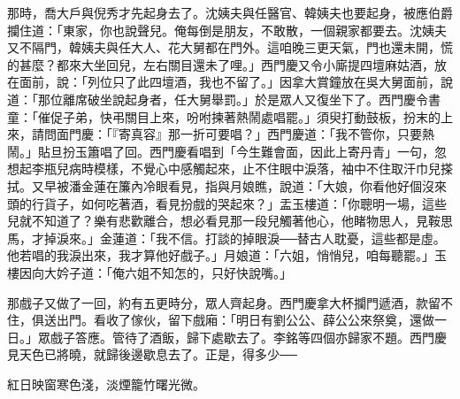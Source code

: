 那時，喬大戶與倪秀才先起身去了。沈姨夫與任醫官、韓姨夫也要起身，被應伯爵攔住道：「東家，你也說聲兒。俺每倒是朋友，不敢散，一個親家都要去。沈姨夫又不隔門，韓姨夫與任大人、花大舅都在門外。這咱晚三更天氣，門也還未開，慌的甚麼？都來大坐回兒，左右關目還未了哩。」西門慶又令小廝提四壇麻姑酒，放在面前，說：「列位只了此四壇酒，我也不留了。」因拿大賞鐘放在吳大舅面前，說道：「那位離席破坐說起身者，任大舅舉罰。」於是眾人又復坐下了。西門慶令書童：「催促子弟，快弔關目上來，吩咐揀著熱鬧處唱罷。」須臾打動鼓板，扮末的上來，請問面門慶：「『寄真容』那一折可要唱？」西門慶道：「我不管你，只要熱鬧。」貼旦扮玉簫唱了回。西門慶看唱到「今生難會面，因此上寄丹青」一句，忽想起李瓶兒病時模樣，不覺心中感觸起來，止不住眼中淚落，袖中不住取汗巾兒搽拭。又早被潘金蓮在簾內冷眼看見，指與月娘瞧，說道：「大娘，你看他好個沒來頭的行貨子，如何吃著酒，看見扮戲的哭起來？」盂玉樓道：「你聰明一場，這些兒就不知道了？樂有悲歡離合，想必看見那一段兒觸著他心，他睹物思人，見鞍思馬，才掉淚來。」金蓮道：「我不信。打談的掉眼淚──替古人耽憂，這些都是虛。他若唱的我淚出來，我才算他好戲子。」月娘道：「六姐，悄悄兒，咱每聽罷。」玉樓因向大妗子道：「俺六姐不知怎的，只好快說嘴。」

那戲子又做了一回，約有五更時分，眾人齊起身。西門慶拿大杯攔門遞酒，款留不住，俱送出門。看收了傢伙，留下戲廂：「明日有劉公公、薛公公來祭奠，還做一日。」眾戲子答應。管待了酒飯，歸下處歇去了。李銘等四個亦歸家不題。西門慶見天色已將曉，就歸後邊歇息去了。正是，得多少──

紅日映窗寒色淺，淡煙籠竹曙光微。

